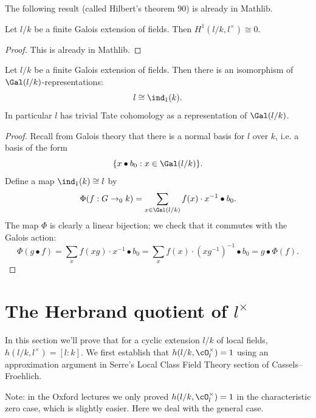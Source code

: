 The following result (called Hilbert's theorem 90) is already in Mathlib.

\begin{theorem}\label{thm:hilbert 90}
	\mathlibok
	Let $l/k$ be a finite Galois extension of fields.
	Then $H^1(l/k, l^\times) \cong 0$.
\end{theorem}

\begin{proof}
	\mathlibok
	This is already in Mathlib.
\end{proof}

\begin{theorem}\label{thm:additive field trivial}
	\leanok
	Let $l/k$ be a finite Galois extension of fields.
	Then there is an isomorphism of $\Gal(l/k)$-representations:
	\[
		l \cong \ind_1(k).
	\]
	In particular $l$ has trivial Tate cohomology as a representation of $\Gal(l/k)$.
\end{theorem}

\begin{proof}
	\leanok
	Recall from Galois theory that there is a normal basis for $l$ over $k$, i.e. a basis of the
	form
	\[
		\{x \bullet b_0 : x \in \Gal(l/k)\}.
	\]
	Define a map $\ind_1(k) \cong l$ by
	\[
		\Phi (f : G \to_0 k) = \sum_{x \in \Gal(l/k)} f(x) \cdot x^{-1} \bullet b_0.
	\]
	The map $\Phi$ is clearly a linear bijection;
	we check that it commutes with the Galois action:
	\[
		\Phi(g\bullet f)
		= \sum_x f(xg) \cdot x^{-1} \bullet b_0
		= \sum_x f(x) \cdot (xg^{-1})^{-1} \bullet b_0
		= g \bullet \Phi(f).
	\]
\end{proof}






\section{The Herbrand quotient of \texorpdfstring{$l^{\times}$}{l*}}

In this section we'll prove that for a cyclic extension $l/k$
of local fields, $h(l/k,l^\times) = [l:k]$. We first establish
that $h(l/k, \cO_l^\times) = 1$ using an approximation argument
in Serre's Local Class Field Theory section of Cassels--Froehlich.

Note: in the Oxford lectures we only proved $h(l/k, \cO_l^\times) = 1$ in the
characteristic zero case, which is slightly easier. Here we deal
with the general case.


